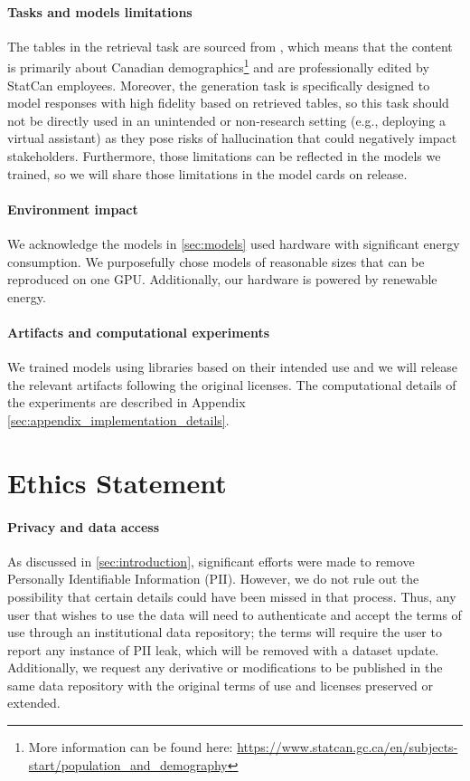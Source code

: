 \documentclass[11pt]{article}
\begin{document}
\paragraph{Tasks and models limitations} 
The tables in the retrieval task are sourced from , which means that the content is primarily about Canadian demographics\footnote{More information can be found here: \url{https://www.statcan.gc.ca/en/subjects-start/population_and_demography}} and are professionally edited by StatCan employees. Moreover, the generation task is specifically designed to model responses with high fidelity based on retrieved tables, so this task should not be directly used in an unintended or non-research setting (e.g., deploying a virtual assistant) as they pose risks of hallucination that could negatively impact stakeholders. Furthermore, those limitations can be reflected in the models we trained, so we will share those limitations in the model cards \citep{mitchell_model_2019} on release.


\paragraph{Environment impact}
We acknowledge the models in \autoref{sec:models} used hardware with significant energy consumption. We purposefully chose models of reasonable sizes that can be reproduced on one GPU. Additionally, our hardware is powered by renewable energy. 

\paragraph{Artifacts and computational experiments}
We trained models using libraries based on their intended use and we will release the relevant artifacts following the original licenses. The computational details of the experiments are described in Appendix \ref{sec:appendix_implementation_details}.


\section*{Ethics Statement}

\paragraph{Privacy and data access} 
As discussed in \autoref{sec:introduction}, significant efforts were made to remove Personally Identifiable Information (PII). However, we do not rule out the possibility that certain details could have been missed in that process. Thus, any user that wishes to use the data will need to authenticate and accept the terms of use through an institutional data repository; the terms will require the user to report any instance of PII leak, which will be removed with a dataset update. Additionally, we request any derivative or modifications to be published in the same data repository with the original terms of use and licenses preserved or extended.
\end{document}

